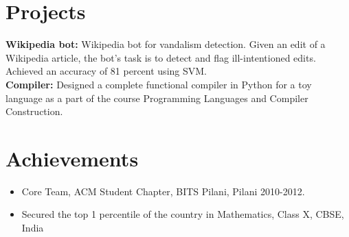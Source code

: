\documentclass[letterpaper]{article}
\begin{document}
\section*{Projects}
\textbf{Wikipedia bot:}
Wikipedia bot for vandalism detection. Given an edit of a Wikipedia article, the bot's task is to detect and flag ill-intentioned edits. Achieved an accuracy of 81 percent using SVM.\\
\textbf{Compiler:}
Designed a complete functional compiler in Python for a toy language as a part of the course Programming Languages and Compiler Construction.

\section*{Achievements}
\begin{itemize}
\item Core Team, ACM Student Chapter, BITS Pilani, Pilani 2010-2012.
\vspace{-2mm}
\item Secured the top 1 percentile of the country in Mathematics, Class X, CBSE, India
\end{itemize}
\end{document}

